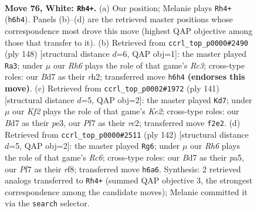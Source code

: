 \documentclass[11pt]{article}
\begin{document}
\clearpage

\begin{figure}[p]\centering
\begin{subfigure}{0.46\textwidth}\centering
\resizebox{\linewidth}{!}{%
\newchessgame
\chessboard[
  setfen={8/3B1P2/7R/8/1k6/8/5K1P/8 w - - 5 76},
  showmover=false,
  pgfstyle=straightmove, color=movearrow, markmove={h6-h4}
]}
\caption{}
\end{subfigure}\hfill
\begin{subfigure}{0.46\textwidth}\centering
\resizebox{\linewidth}{!}{%
\newchessgame
\chessboard[
  setfen={8/6k1/8/4K3/p7/2R2P2/7r/8 w - - 16 75},
  showmover=false,
  pgfstyle=straightmove, color=movearrow, markmove={c3-a3}
]}
\caption{}
\end{subfigure}
\\[4pt]
\begin{subfigure}{0.46\textwidth}\centering
\resizebox{\linewidth}{!}{%
\newchessgame
\chessboard[
  setfen={8/4k3/8/p3K3/8/4P3/2R5/r7 b - - 2 71},
  showmover=false,
  pgfstyle=straightmove, color=movearrow, markmove={e7-d7}
]}
\caption{}
\end{subfigure}\hfill
\begin{subfigure}{0.46\textwidth}\centering
\resizebox{\linewidth}{!}{%
\newchessgame
\chessboard[
  setfen={5r2/k7/2R5/p7/8/8/K1P5/8 w - - 16 72},
  showmover=false,
  pgfstyle=straightmove, color=movearrow, markmove={c6-g6}
]}
\caption{}
\end{subfigure}
\caption{\textbf{Move 76, White: \texttt{Rh4+}.} (a) Our position; Melanie plays \texttt{Rh4+} (\texttt{h6h4}). Panels (b)--(d) are the retrieved master positions whose correspondence most drove this move (highest QAP objective among those that transfer to it). (b) Retrieved from \texttt{ccrl\_top\_p0000\#2490} (ply 148) [structural distance $d$=6, QAP obj=1]: the master played \texttt{Ra3}; under $\mu$ our \emph{Rh6} plays the role of that game's \emph{Rc3}; cross-type roles: our \emph{B}d7 as their \emph{r}h2; transferred move \texttt{h6h4} \textbf{(endorses this move)}. (c) Retrieved from \texttt{ccrl\_top\_p0002\#1972} (ply 141) [structural distance $d$=5, QAP obj=2]: the master played \texttt{Kd7}; under $\mu$ our \emph{Kf2} plays the role of that game's \emph{Ke2}; cross-type roles: our \emph{B}d7 as their \emph{p}e3, our \emph{P}f7 as their \emph{r}c2; transferred move \texttt{f2e2}. (d) Retrieved from \texttt{ccrl\_top\_p0000\#2511} (ply 142) [structural distance $d$=5, QAP obj=2]: the master played \texttt{Rg6}; under $\mu$ our \emph{Rh6} plays the role of that game's \emph{Rc6}; cross-type roles: our \emph{B}d7 as their \emph{p}a5, our \emph{P}f7 as their \emph{r}f8; transferred move \texttt{h6a6}. Synthesis: 2 retrieved analogs transferred to \texttt{Rh4+} (summed QAP objective 3, the strongest correspondence among the candidate moves); Melanie committed it via the \texttt{search} selector.}
\label{fig:thought-m150}
\end{figure}
\end{document}
